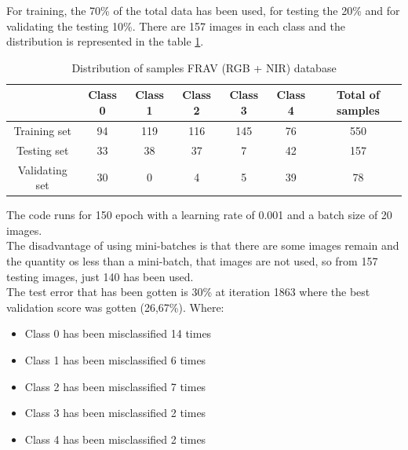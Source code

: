 For training, the 70\% of the total data has been used, for testing the 20\% and for validating the testing 10\%. There are 157 images in each class and the distribution is represented in the table \ref{FRAV_distribution1}.\\

\begin{table}[htb]
\centering
\label{FRAV_distribution1}
\begin{tabular}{c|ccccc|c|}
\cline{2-7}
                                     & \multicolumn{1}{c|}{Class 0} & \multicolumn{1}{c|}{Class 1} & \multicolumn{1}{c|}{Class 2} & \multicolumn{1}{c|}{Class 3} & Class 4 & Total of samples \\ \hline
\multicolumn{1}{|c|}{Training set}  & 94                           & 119                          & 116                          & 145                          & 76      & 550              \\ \cline{1-1}
\multicolumn{1}{|c|}{Testing set}    & 33                           & 38                           & 37                           & 7                            & 42      & 157              \\ \cline{1-1}
\multicolumn{1}{|c|}{Validating set} & 30                           & 0                            & 4                            & 5                            & 39      & 78               \\ \hline
\end{tabular} \caption{Distribution of samples FRAV (RGB + NIR) database}

\end{table}

The code runs for 150 epoch with a learning rate of 0.001 and a batch size of 20 images.\\

The disadvantage of using mini-batches is that there are some images remain and the quantity os less than a mini-batch, that images are not used, so from 157 testing images, just 140 has been used.\\

The test error that has been gotten is 30\% at iteration 1863 where the best validation score was gotten (26,67\%). Where:

\begin{itemize}
\item Class 0 has been misclassified  14 times
\item Class 1 has been misclassified  6 times
\item Class 2 has been misclassified  7 times
\item Class 3 has been misclassified  2 times
\item Class 4 has been misclassified  2 times
\end{itemize}

